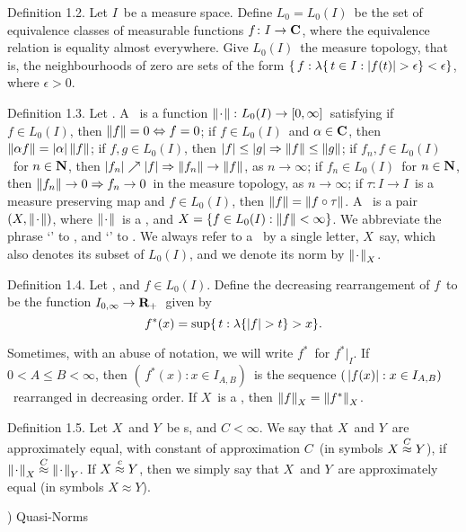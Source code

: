 \proclaim Definition 1.2. Let $I$\ be a measure space. Define $L_0
= L_0(I)$\ be
the set of equivalence classes of measurable functions $f\colon I\to{\bf C}$,
where
the equivalence relation is equality almost everywhere. Give $L_0(I)$\
the {\dt
measure topology}, that is, the neighbourhoods of zero are sets of
the
form $\{\, f : \lambda\{\,t\in I:\modo{f(t)}>\epsilon\} < \epsilon\}$,
where
$\epsilon>0$.
 
\proclaim Definition 1.3. Let \Ibasms. A {\dt \fullrif\onI}\ is a
function
$\left\| \kern0.8pt\cdot\kern0.8pt \right\|\colon L_0(I)\to[0,\infty]$\ satisfying
f $f\in L_0(I)$, then $\left\| f \right\|=0\Leftrightarrow f=0$;
\itemii if $f\in L_0(I)$\ and $\alpha\in{\bf C}$, then $\left\| \alpha
f \right\|=\left|\alpha\right|
\left\| f \right\|$;
\itemiii if $f,g\in L_0(I)$, then $\left| f\right|\le\left| g\right| \Rightarrow
\left\| f \right\|\le
\left\| g \right\|$;
\itemiv if $f_n,f\in L_0(I)$\ for $n\in{\bf N}$, then $\left| f_n\right|\nearrow\left| f\right| \Rightarrow \left\| f_n \right\|\to\left\| f \right\|$, as $n\to\infty$;
f $f_n\in L_0(I)$\ for $n\in{\bf N}$, then $\left\| f_n \right\|\to0
\Rightarrow f_n\to0$\ in the measure topology, as $n\to\infty$;
\itemvi if $\tau\colon I\to I$\ is a measure preserving map and $f\in
L_0(I)$,
then $\left\| f \right\| = \left\| f\circ\tau \right\|$.
\moreproclaim\noindent
A {\dt \fullris\onI}\ is a pair $(X,\left\| \kern0.8pt\cdot\kern0.8pt \right\|)$, where $\left\| \kern0.8pt\cdot\kern0.8pt \right\|$\
is a
\fullrif\onI, and $X=\{f\in L_0(I):\left\| f \right\| <\infty\}$. We abbreviate
the
phrase `\fullrif' to {\dt \rif}, and `\fullris' to {\dt \ris}. We
always refer to a \ris\ by a single letter, $X$\ say, which also
denotes its subset of $L_0(I)$, and we denote its norm by $\left\| \kern0.8pt\cdot\kern0.8pt \right\|_X$.
 
\proclaim Definition 1.4. Let \Ibasms, and $f\in L_0(I)$. Define
the {\dt
decreasing rearrangement} of $f$\ to be the function
$I_{0,\infty}\to{\bf R}_+$\ given by
$$ f^*(x) = \sup \{\, t:\lambda\{\modo f>t\} >x\} .$$
 
Sometimes, with an abuse of notation, we will write $f^*$\ for $f^*\big|_I$.
If $0<A\le B<\infty$, then $(\,f^*(x):x\in I_{A,B})$\ is the sequence
$(\,\left| f(x)\right|:x\in I_{A,B})$\ rearranged in decreasing order. If
$X$\ is a
\ris, then $\left\| f \right\|_X = \left\| f^* \right\|_X$.
 
\proclaim Definition 1.5. Let $X$\ and $Y$\ be \ris s, and $C<\infty$.
We say that
$X$\ and $Y$\ are {\dt approximately equal, with constant of approximation
$C$}\ (in symbols $X \labelledapprox C Y$), if $\normdot_X \labelledapprox
C
\normdot_Y$.
If $X \labelledapprox c Y$, then we simply say that $X$\ and $Y$\
are
{\dt approximately equal} (in symbols $X\approx Y$).
 
) Quasi-Norms
 
